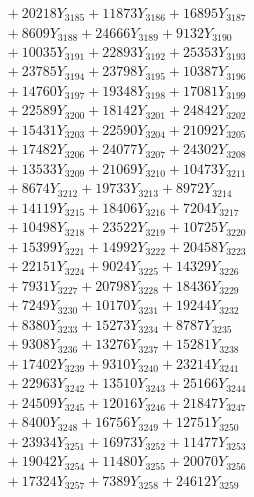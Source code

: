 \documentclass[a4paper,10pt]{article}
\begin{document}
{\begin{align}
&\;  + 20218 Y_{3185} + 11873 Y_{3186} + 16895 Y_{3187} \\[0.3ex]
&\;  + 8609 Y_{3188} + 24666 Y_{3189} + 9132 Y_{3190} \\[0.3ex]
&\;  + 10035 Y_{3191} + 22893 Y_{3192} + 25353 Y_{3193} \\[0.3ex]
&\;  + 23785 Y_{3194} + 23798 Y_{3195} + 10387 Y_{3196} \\[0.3ex]
&\;  + 14760 Y_{3197} + 19348 Y_{3198} + 17081 Y_{3199} \\[0.3ex]
&\;  + 22589 Y_{3200} + 18142 Y_{3201} + 24842 Y_{3202} \\[0.3ex]
&\;  + 15431 Y_{3203} + 22590 Y_{3204} + 21092 Y_{3205} \\[0.3ex]
&\;  + 17482 Y_{3206} + 24077 Y_{3207} + 24302 Y_{3208} \\[0.5ex]\allowbreak
&\;  + 13533 Y_{3209} + 21069 Y_{3210} + 10473 Y_{3211} \\[0.3ex]
&\;  + 8674 Y_{3212} + 19733 Y_{3213} + 8972 Y_{3214} \\[0.3ex]
&\;  + 14119 Y_{3215} + 18406 Y_{3216} + 7204 Y_{3217} \\[0.3ex]
&\;  + 10498 Y_{3218} + 23522 Y_{3219} + 10725 Y_{3220} \\[0.3ex]
&\;  + 15399 Y_{3221} + 14992 Y_{3222} + 20458 Y_{3223} \\[0.3ex]
&\;  + 22151 Y_{3224} + 9024 Y_{3225} + 14329 Y_{3226} \\[0.3ex]
&\;  + 7931 Y_{3227} + 20798 Y_{3228} + 18436 Y_{3229} \\[0.3ex]
&\;  + 7249 Y_{3230} + 10170 Y_{3231} + 19244 Y_{3232} \\[0.3ex]
&\;  + 8380 Y_{3233} + 15273 Y_{3234} + 8787 Y_{3235} \\[0.3ex]
&\;  + 9308 Y_{3236} + 13276 Y_{3237} + 15281 Y_{3238} \\[0.5ex]\allowbreak
&\;  + 17402 Y_{3239} + 9310 Y_{3240} + 23214 Y_{3241} \\[0.3ex]
&\;  + 22963 Y_{3242} + 13510 Y_{3243} + 25166 Y_{3244} \\[0.3ex]
&\;  + 24509 Y_{3245} + 12016 Y_{3246} + 21847 Y_{3247} \\[0.3ex]
&\;  + 8400 Y_{3248} + 16756 Y_{3249} + 12751 Y_{3250} \\[0.3ex]
&\;  + 23934 Y_{3251} + 16973 Y_{3252} + 11477 Y_{3253} \\[0.3ex]
&\;  + 19042 Y_{3254} + 11480 Y_{3255} + 20070 Y_{3256} \\[0.3ex]
&\;  + 17324 Y_{3257} + 7389 Y_{3258} + 24612 Y_{3259} \\[0.3ex]

\end{align}}
\end{document}
